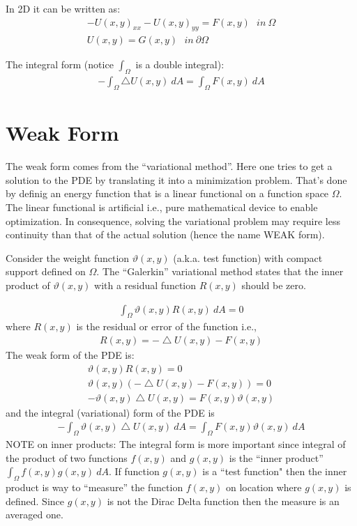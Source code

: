 \documentclass{birkjour}
\numberwithin{equation}{section}
\begin{document}
In 2D it can be written as:
\begin{eqnarray}
 - U(x, y)_{xx} - U(x, y)_{yy} = F(x,y)  \ \ \   in \ \Omega \nonumber\\
U(x,y) = G(x,y)   \ \ \   in \ \partial \Omega \nonumber
\end{eqnarray}

The integral form (notice $\int_{\Omega}$ is a double integral):
\begin{eqnarray}
 - \int_{\Omega} { \bigtriangleup U(x,y) \ dA } = \int_{\Omega} { F(x,y) \ dA }
\end{eqnarray}

\section{Weak Form}

The weak form comes from the ``variational method''. Here one tries to get a solution to the 
PDE by translating it into a minimization problem. That's done by definig an energy function that is a 
linear functional on a function space $\Omega$. The linear functional is artificial i.e., pure 
mathematical device to enable optimization. In consequence, solving the variational problem may 
require less continuity than that of the actual solution (hence the name WEAK form).
 
Consider the weight function $\vartheta (x,y)$ (a.k.a. test function) with compact support defined on $\Omega$.
The ``Galerkin'' variational method states that the inner product of $\vartheta(x,y)$ with a residual function $R(x,y)$ should be zero.

\begin{eqnarray}
	\int_{\Omega} { \vartheta(x, y) R(x,y) \ dA } = 0 \nonumber
\end{eqnarray}
 where $R(x,y)$ is the residual or error of the function i.e., 
\begin{eqnarray}
	R(x,y) = - \bigtriangleup U(x,y) - F(x,y) \nonumber
\end{eqnarray}
The weak form of the PDE is:
\begin{eqnarray}
	\vartheta(x, y) R(x,y) = 0 \nonumber\\
	\vartheta(x, y) (- \bigtriangleup U(x,y) - F(x,y)) = 0 \nonumber\\
	- \vartheta(x,y) \bigtriangleup U(x,y) = F(x,y) \vartheta(x,y) \nonumber
\end{eqnarray}
 and the integral (variational) form of the PDE is
\begin{eqnarray}
	\label{eqn:original_weak_form}
	- \int_{\Omega}{ \vartheta(x,y) \bigtriangleup U(x,y) \ dA } = \int_{\Omega} { F(x,y) \vartheta(x,y) \ dA }
\end{eqnarray}
NOTE on inner products: The integral form is more important since integral of the product 
of two functions $f(x,y)$ and $g(x,y)$ is the ``inner product'' $\int_{\Omega}{ f(x,y) g(x,y) \ dA }$.
If function $g(x,y)$ is a ``test function" then the inner product is way to ``measure'' the 
function $f(x,y)$ on location where $g(x,y)$ is defined. Since $g(x,y)$ is not the Dirac Delta 
function then the measure is an averaged one.
 
\end{document}
